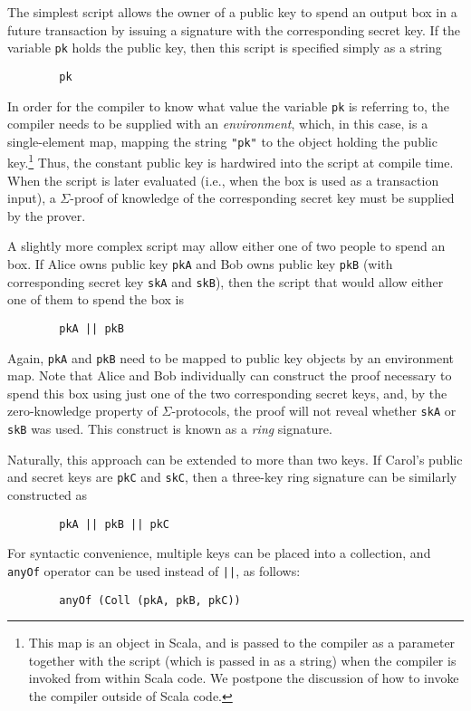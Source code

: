 \documentclass[11pt]{article}
\begin{document}
The simplest script allows the owner of a public key to spend an output box in a future transaction by issuing a signature with the corresponding secret key. If the variable \texttt{pk} holds the public key, then this script is specified simply as a string
\begin{verbatim}
        pk
\end{verbatim}

In order for the compiler to know what value the variable \texttt{pk} is referring to, the compiler needs to be supplied with an \emph{environment}, which, in this case, is a single-element map, mapping the string \texttt{"pk"} to the object holding the public key.\footnote{This map is an object in Scala, and is passed to the compiler as a parameter together with the script (which is passed in as a string) when the compiler is invoked from within Scala code. We postpone the discussion of how to invoke the compiler outside of Scala code.}
Thus, the constant public key is hardwired into the script at compile time. When the script is later evaluated (i.e., when the box is used as a transaction input), a $\Sigma$-proof of knowledge of the corresponding secret key must be supplied by the prover. 

A slightly more complex script may allow either one of two people to spend an box. If Alice owns public key \texttt{pkA}  and Bob owns public key \texttt{pkB} (with corresponding secret key \texttt{skA} and \texttt{skB}), then the script that would allow either one of them to spend the box is
\begin{verbatim}
        pkA || pkB
\end{verbatim}
Again, \texttt{pkA} and \texttt{pkB} need to be mapped to public key objects by an environment map.
Note that Alice and Bob individually can construct the proof necessary to spend this box using just one of the two corresponding secret keys, and, by the zero-knowledge property of $\Sigma$-protocols, the proof will not reveal whether \texttt{skA} or \texttt{skB} was used. This construct is known as a \emph{ring} signature.

Naturally, this approach can be extended to more than two keys. If Carol's public and secret keys are \texttt{pkC} and \texttt{skC}, then a three-key ring signature can be similarly constructed as
\begin{verbatim}
        pkA || pkB || pkC
\end{verbatim}
	
For syntactic convenience, multiple keys can be placed into a collection, and \texttt{anyOf} operator can be used instead of \texttt{||}, as follows:
\begin{verbatim}
        anyOf (Coll (pkA, pkB, pkC))
\end{verbatim}
\end{document}
